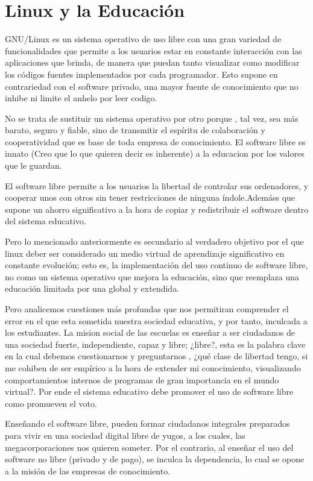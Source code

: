 \chapter*{Linux y la Educación}
GNU/Linux es un sistema operativo de uso libre con una gran variedad de funcionalidades que permite a los usuarios estar en constante interacción  con las aplicaciones que brinda, de manera que puedan tanto visualizar como modificar los códigos fuentes implementados por cada programador. Esto supone en contrariedad con el software privado, una mayor fuente de conocimiento que no inhibe ni limite el anhelo por leer codigo.

No se trata de sustituir un sistema operativo por otro porque , tal vez, sea más barato, seguro y fiable, sino de transmitir el espíritu de colaboración y cooperatividad que es base de toda empresa de conocimiento. El software libre es innato (Creo que lo que quieren decir es inherente) a la educacion por los valores que le guardan.

El software libre permite a los usuarios la libertad de controlar sus ordenadores, y cooperar unos con otros sin tener restricciones de ninguna índole.Ademáss que supone un ahorro significativo a la hora de copiar y redistribuir el software dentro del sistema educativo.

Pero lo mencionado anteriormente es secundario al verdadero objetivo por el que linux deber ser considerado un medio virtual de aprendizaje significativo en constante evolución; esto es,  la implementación del uso continuo de software libre, no como un sistema operativo que mejora la educación, sino que reemplaza una educación limitada por una global y extendida.

Pero analicemos cuestiones más profundas que nos permitiran comprender el error en el que esta sometida nuestra sociedad educativa, y por tanto, inculcada a los estudiantes.
La mision social de las escuelas es enseñar a ser ciudadanos de una sociedad fuerte, independiente, capaz y libre; ¿libre?, esta es la palabra clave en la cual debemos cuestionarnos y preguntarnos , ¿qué clase de libertad tengo, si me cohiben de ser empírico a la hora de extender mi conocimiento, visualizando comportamientos internos de programas de gran importancia en el mundo virtual?. Por ende el sistema educativo debe promover el uso de software libre como promueven el voto.

Enseñando el software libre, pueden formar ciudadanos integrales preparados para vivir en una sociedad digital libre de yugos, a los cuales, las megacorporaciones nos quieren someter. Por el contrario, al enseñar el uso del software no libre (privado y de pago), se inculca la dependencia, lo cual se opone a la misión de las empresas de conocimiento.

